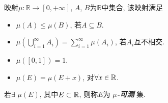 \documentclass[12pt, a4paper, oneside, UTF8]{ctexbook}  %
\begin{document}
\begin{defn}
    映射$\mu :\mathbb{R}\to [0, +\infty]$, $A$, $B$为$\mathbb{R}$中集合, 该映射满足
    \begin{itemize}
        \item $\mu(A)\leq \mu(B)$, 若$A\subseteq B$.
        \item $\mu(\bigcup_{i=1}^{\infty}A_i) =\sum_{i=1}^{\infty}\mu(A_i)$, 若$A_i$互不相交.
        \item $\mu([0,1])=1$.
        \item $\mu(E)=\mu(E+x)$, 对$\forall x\in\mathbb{R}$.
    \end{itemize}
    \par 若$\exists$ $\mu(E)$, 其中$E\subset \mathbb{R}$, 则称$E$为 \textbf{\emph{$\mu$-可测}} 集.
\end{defn}


\ifx\allfiles\undefined
\end{document}

